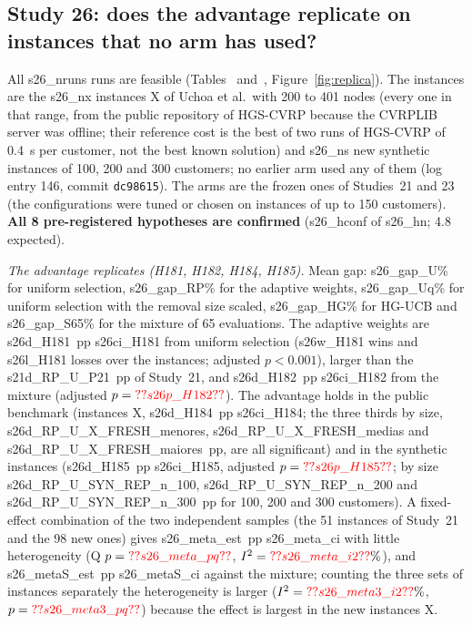 


\subsection{Study 26: does the advantage replicate on instances that no arm has used?}\label{sec:s26}
All \num{s26_nruns} runs are feasible (Tables~ and~, Figure~\ref{fig:replica}). The instances are the \num{s26_nx} instances X of Uchoa et al.\ with 200 to 401 nodes (every one in that range, from the public repository of HGS-CVRP because the CVRPLIB server was offline; their reference cost is the best of two runs of HGS-CVRP of 0.4~s per customer, not the best known solution) and \num{s26_ns} new synthetic instances of 100, 200 and 300 customers; no earlier arm used any of them (log entry 146, commit \texttt{dc98615}). The arms are the frozen ones of Studies~21 and 23 (the configurations were tuned or chosen on instances of up to 150 customers). \textbf{All 8 pre-registered hypotheses are confirmed} (\num{s26_hconf} of \num{s26_hn}; 4.8 expected).

\emph{The advantage replicates (H181, H182, H184, H185).} Mean gap: \num{s26_gap_U}\% for uniform selection, \num{s26_gap_RP}\% for the adaptive weights, \num{s26_gap_Uq}\% for uniform selection with the removal size scaled, \num{s26_gap_HG}\% for HG-UCB and \num{s26_gap_S65}\% for the mixture of 65 evaluations. The adaptive weights are \num{s26d_H181}~pp \num{s26ci_H181} from uniform selection (\num{s26w_H181} wins and \num{s26l_H181} losses over the instances; adjusted $p<0.001$), larger than the \num{s21d_RP_U_P21}~pp of Study~21, and \num{s26d_H182}~pp \num{s26ci_H182} from the mixture (adjusted $p=\num{s26p_H182}$). The advantage holds in the public benchmark (instances X, \num{s26d_H184}~pp \num{s26ci_H184}; the three thirds by size, \num{s26d_RP_U_X_FRESH_menores}, \num{s26d_RP_U_X_FRESH_medias} and \num{s26d_RP_U_X_FRESH_maiores}~pp, are all significant) and in the synthetic instances (\num{s26d_H185}~pp \num{s26ci_H185}, adjusted $p=\num{s26p_H185}$; by size \num{s26d_RP_U_SYN_REP_n_100}, \num{s26d_RP_U_SYN_REP_n_200} and \num{s26d_RP_U_SYN_REP_n_300}~pp for 100, 200 and 300 customers). A fixed-effect combination of the two independent samples (the 51 instances of Study~21 and the 98 new ones) gives \num{s26_meta_est}~pp \num{s26_meta_ci} with little heterogeneity (Q $p=\num{s26_meta_pq}$, $I^2=\num{s26_meta_i2}\%$), and \num{s26_metaS_est}~pp \num{s26_metaS_ci} against the mixture; counting the three sets of instances separately the heterogeneity is larger ($I^2=\num{s26_meta3_i2}\%$, $p=\num{s26_meta3_pq}$) because the effect is largest in the new instances X.


